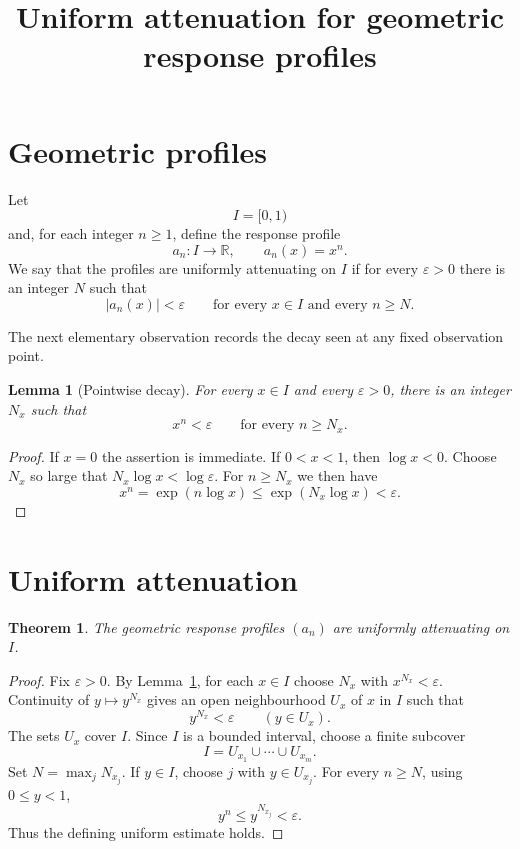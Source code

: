 \documentclass{article}
\title{Uniform attenuation for geometric response profiles}
\author{}
\date{}
\newtheorem{lemma}{Lemma}
\newtheorem{theorem}{Theorem}
\begin{document}
\maketitle

\section{Geometric profiles}

Let
\[
I=[0,1)
\]
and, for each integer \(n\geq 1\), define the response profile
\[
a_n:I\to\mathbb R,\qquad a_n(x)=x^n.
\]
We say that the profiles are uniformly attenuating on \(I\) if for every
\(\varepsilon>0\) there is an integer \(N\) such that
\[
  |a_n(x)|<\varepsilon
  \qquad\text{for every }x\in I\text{ and every }n\geq N.
\]

The next elementary observation records the decay seen at any fixed
observation point.

\begin{lemma}[Pointwise decay]\label{lem:pointwise}
For every \(x\in I\) and every \(\varepsilon>0\), there is an integer
\(N_x\) such that
\[
  x^n<\varepsilon\qquad\text{for every }n\geq N_x.
\]
\end{lemma}

\begin{proof}
If \(x=0\) the assertion is immediate.  If \(0<x<1\), then
\(\log x<0\).  Choose \(N_x\) so large that \(N_x\log x<\log\varepsilon\).
For \(n\geq N_x\) we then have
\[
  x^n=\exp(n\log x)\leq \exp(N_x\log x)<\varepsilon.
\]
\end{proof}

\section{Uniform attenuation}

\begin{theorem}\label{thm:uniform-decay}
The geometric response profiles \((a_n)\) are uniformly attenuating on
\(I\).
\end{theorem}

\begin{proof}
Fix \(\varepsilon>0\).  By Lemma~\ref{lem:pointwise}, for each \(x\in I\)
choose \(N_x\) with \(x^{N_x}<\varepsilon\).  Continuity of
\(y\mapsto y^{N_x}\) gives an open neighbourhood \(U_x\) of \(x\) in
\(I\) such that
\[
  y^{N_x}<\varepsilon\qquad (y\in U_x).
\]
The sets \(U_x\) cover \(I\).  Since \(I\) is a bounded interval, choose
a finite subcover
\[
  I=U_{x_1}\cup\cdots\cup U_{x_m}.
\]
Set \(N=\max_j N_{x_j}\).  If \(y\in I\), choose \(j\) with
\(y\in U_{x_j}\).  For every \(n\geq N\), using \(0\leq y<1\),
\[
  y^n\leq y^{N_{x_j}}<\varepsilon.
\]
Thus the defining uniform estimate holds.
\end{proof}
\end{document}
